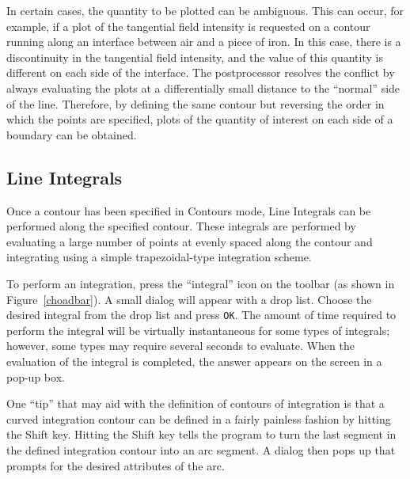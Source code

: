 \documentclass[12pt]{report}
\begin{document}
In certain cases, the quantity to be plotted can be ambiguous. This
can occur, for example, if a plot of the tangential field intensity
is requested on a contour running along an interface between air
and a piece of iron.  In this case, there is a discontinuity in the
tangential field intensity, and the value of this quantity is
different on each side of the interface.  The postprocessor
resolves the conflict by always evaluating the plots at a
differentially small distance to the ``normal'' side of the line.
Therefore, by defining the same contour but reversing the order in
which the points are specified, plots of the quantity of interest
on each side of a boundary can be obtained.




\subsection{Line Integrals}

Once a contour has been specified in Contours mode, Line Integrals
can be performed along the specified contour.  These integrals are
performed by evaluating a large number of points at evenly spaced
along the contour and integrating using a simple trapezoidal-type
integration scheme.

To perform an integration, press the ``integral'' icon on the
toolbar (as shown in Figure~\ref{choadbar}).  A small dialog will
appear with a drop list.  Choose the desired integral from the drop
list and press {\tt OK}.  The amount of time required to perform
the integral will be virtually instantaneous for some types of
integrals; however, some types may require several seconds to
evaluate.  When the evaluation of the integral is completed, the
answer appears on the screen in a pop-up box.

One ``tip'' that may aid with the definition of contours of integration is
that a curved integration contour can be defined in a fairly painless
fashion by hitting the Shift key.  Hitting the Shift key tells the program
to turn the last segment in the defined integration contour into an arc
segment.  A dialog then pops up that prompts for the desired attributes of
the arc.
\end{document}
